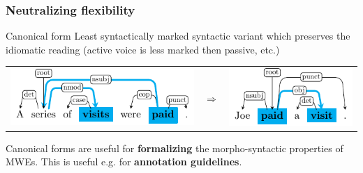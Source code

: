 \documentclass[xcolor=dvipsnames]{beamer}
\begin{document}
\begin{frame} 
\frametitle{Neutralizing flexibility}

\begin{block}{Canonical form}
Least syntactically marked syntactic variant which preserves the idiomatic reading (active voice is less marked then passive, etc.)

\begin{tabular}{ccc}
\includegraphics[width=.45\textwidth]{Images/series-of-visits-paid} & 
$\Longrightarrow$ &
\includegraphics[width=.25\textwidth]{Images/pay-visit}
\end{tabular}

\end{block}

\begin{block}{}
Canonical forms are useful for \textbf{formalizing} the morpho-syntactic properties of MWEs. This is useful e.g. for \textbf{annotation guidelines}.
\end{block}

\end{frame}
\end{document}
